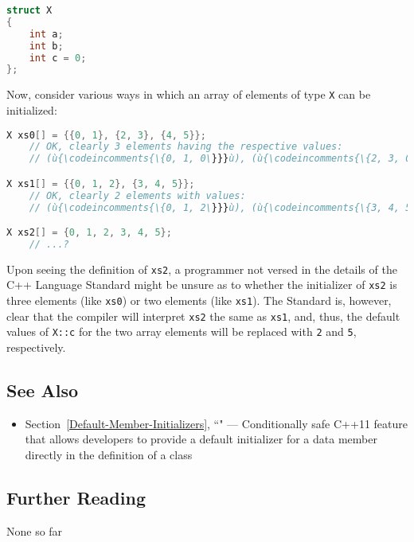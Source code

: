 \begin{lstlisting}[language=C++]
struct X
{
    int a;
    int b;
    int c = 0;
};
\end{lstlisting}

\noindent Now, consider various ways in which an array of elements of type
\texttt{X} can be initialized:

\begin{lstlisting}[language=C++]
X xs0[] = {{0, 1}, {2, 3}, {4, 5}};
    // OK, clearly 3 elements having the respective values:
    // (ù{\codeincomments{\{0, 1, 0\}}}ù), (ù{\codeincomments{\{2, 3, 0\}}}ù), (ù{\codeincomments{\{4, 5, 0\}}}ù)

X xs1[] = {{0, 1, 2}, {3, 4, 5}};
    // OK, clearly 2 elements with values:
    // (ù{\codeincomments{\{0, 1, 2\}}}ù), (ù{\codeincomments{\{3, 4, 5\}}}ù)

X xs2[] = {0, 1, 2, 3, 4, 5};
    // ...?
\end{lstlisting}

\noindent Upon seeing the definition of \texttt{xs2}, a programmer not versed in
the details of the C++ Language Standard might be unsure as to whether the
initializer of \texttt{xs2} is three elements (like \texttt{xs0}) or two
elements (like \texttt{xs1}). The Standard is, however, clear that the
compiler will interpret \texttt{xs2} the same as \texttt{xs1}, and,
thus, the default values of \texttt{X::c} for the two array elements
will be replaced with \texttt{2} and \texttt{5}, respectively.

\subsection[See Also]{See Also}\label{see-also}

\begin{itemize}
\item{Section~\ref{Default-Member-Initializers}, ``" — Conditionally safe C++11 feature that allows developers to provide a default initializer for a data member directly in the definition of a class}
\end{itemize}

\subsection[Further Reading]{Further Reading}\label{further-reading}

None so far

